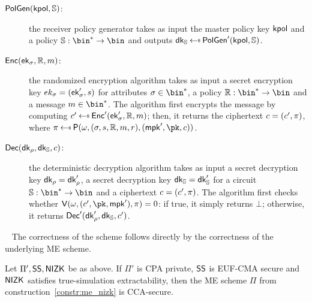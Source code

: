 \begin{construction}
\begin{description}
        \item[$\mathsf{PolGen}(\mathsf{kpol}, \mathbb{S})$:] the receiver policy generator takes as input the master policy key $\mathsf{kpol}$ and a policy $\saccess: \bin^* \to \bin$ and outputs $\dk_\saccess \getsr \polgen'(\kpol, \saccess)$.
        \item[$\mathsf{Enc}(\mathsf{ek}_\sigma, \mathbb{R}, m)$:] the randomized encryption algorithm takes as input a secret encryption key $ek_\sigma = (\mathsf{ek}'_\sigma, s)$ for attributes $\sattr \in \bin^*$, a policy $\raccess: \bin^* \to \bin$ and a message $\msg \in \bin^*$. The algorithm first encrypts the message by computing $\cipher' \getsr \enc'(\ek'_\sattr, \raccess, \msg)$; then, it returns the ciphertext $c = (c', \pi)$, where $\pi \getsr \prover(\crs, (\sattr, \signature, \raccess, \msg, r),(\mpk', \pk, \cipher))$.
        \item[$\mathsf{Dec}(\mathsf{dk}_\rho, \mathsf{dk}_{\mathbb{S}}, c)$:] the deterministic decryption algorithm takes as input a secret decryption key $\mathsf{dk}_\rho = \mathsf{dk}'_\rho$, a secret decryption key $\mathsf{dk}_{\mathbb{S}} = \mathsf{dk}'_{\mathbb{S}}$ for a circuit $\saccess: \bin^* \to \bin$ and a ciphertext $c = (c', \pi)$. The algorithm first checks whether $\verifier(\crs, (\cipher', \pk, \mpk'), \pi) = 0$: if true, it simply returns $\bot$; otherwise, it returns $\mathsf{Dec}'(\mathsf{dk}'_\rho, \mathsf{dk}_{\mathbb{S}}, c')$.
    \end{description}
\end{construction}
~\newline
The correctness of the scheme follows directly by the correctness of the underlying ME scheme.

\begin{theorem}\label{theo:me_nizk}
    Let $\Pi', \mathsf{SS}, \mathsf{NIZK}$ be as above. If $\Pi'$ is CPA private, $\mathsf{SS}$ is EUF-CMA secure and $\mathsf{NIZK}$ satisfies true-simulation extractability, then the ME scheme $\Pi$ from construction~\ref{constr:me_nizk} is CCA-secure.
\end{theorem}

